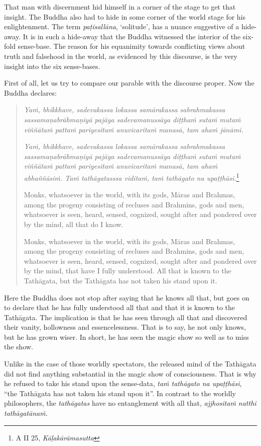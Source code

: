 That man with discernment hid himself in a corner of the stage to get that insight. The Buddha also had to hide in some corner of the world stage for his enlightenment. The term \emph{paṭisallāna}, `solitude', has a nuance suggestive of a hide-away. It is in such a hide-away that the Buddha witnessed the interior of the six-fold sense-base. The reason for his equanimity towards conflicting views about truth and falsehood in the world, as evidenced by this discourse, is the very insight into the six sense-bases.

First of all, let us try to compare our parable with the discourse proper. Now the Buddha declares:

\begin{quote}
\emph{Yaṁ, bhikkhave, sadevakassa lokassa samārakassa sabrahmakassa sassamaṇabrāhmaṇiyā pajāya sadevamanussāya diṭṭhaṁ sutaṁ mutaṁ viññātaṁ pattaṁ pariyesitaṁ anuvicaritaṁ manasā, tam ahaṁ jānāmi.}

\emph{Yaṁ, bhikkhave, sadevakassa lokassa samārakassa sabrahmakassa sassamaṇabrāhmaṇiyā pajāya sadevamanussāya diṭṭhaṁ sutaṁ mutaṁ viññātaṁ pattaṁ pariyesitaṁ anuvicaritaṁ manasā, tam ahaṁ abhaññāsiṁ. Taṁ tathāgatasssa viditaṁ, taṁ tathāgato na upaṭṭhāsi.}\footnote{A II 25, \emph{Kāḷakārāmasutta}}

Monks, whatsoever in the world, with its gods, Māras and Brahmas, among the progeny consisting of recluses and Brahmins, gods and men, whatsoever is seen, heard, sensed, cognized, sought after and pondered over by the mind, all that do I know.

Monks, whatsoever in the world, with its gods, Māras and Brahmas, among the progeny consisting of recluses and Brahmins, gods and men, whatsoever is seen, heard, sensed, cognized, sought after and pondered over by the mind, that have I fully understood. All that is known to the Tathāgata, but the Tathāgata has not taken his stand upon it.
\end{quote}

Here the Buddha does not stop after saying that he knows all that, but goes on to declare that he has fully understood all that and that it is known to the Tathāgata. The implication is that he has seen through all that and discovered their vanity, hollowness and essencelessness. That is to say, he not only knows, but he has grown wiser. In short, he has seen the magic show so well as to miss the show.

Unlike in the case of those worldly spectators, the released mind of the Tathāgata did not find anything substantial in the magic show of consciousness. That is why he refused to take his stand upon the sense-data, \emph{taṁ tathāgato na upaṭṭhāsi}, ``the Tathāgata has not taken his stand upon it''. In contrast to the worldly philosophers, the \emph{tathāgatas} have no entanglement with all that, \emph{ajjhositaṁ natthi tathāgatānaṁ.}

